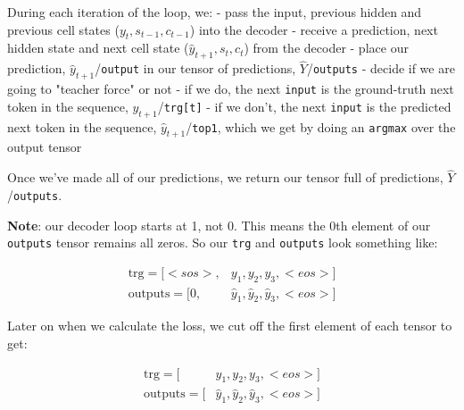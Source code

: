 \documentclass[11pt]{article}
\begin{document}
During each iteration of the loop, we: - pass the input, previous hidden
and previous cell states (\(y_t, s_{t-1}, c_{t-1}\)) into the decoder -
receive a prediction, next hidden state and next cell state
(\(\hat{y}_{t+1}, s_{t}, c_{t}\)) from the decoder - place our
prediction, \(\hat{y}_{t+1}\)/\texttt{output} in our tensor of
predictions, \(\hat{Y}\)/\texttt{outputs} - decide if we are going to
"teacher force" or not - if we do, the next \texttt{input} is the
ground-truth next token in the sequence, \(y_{t+1}\)/\texttt{trg{[}t{]}}
- if we don't, the next \texttt{input} is the predicted next token in
the sequence, \(\hat{y}_{t+1}\)/\texttt{top1}, which we get by doing an
\texttt{argmax} over the output tensor

Once we've made all of our predictions, we return our tensor full of
predictions, \(\hat{Y}\)/\texttt{outputs}.

\textbf{Note}: our decoder loop starts at 1, not 0. This means the 0th
element of our \texttt{outputs} tensor remains all zeros. So our
\texttt{trg} and \texttt{outputs} look something like:

\[\begin{align*}
\text{trg} = [<sos>, &y_1, y_2, y_3, <eos>]\\
\text{outputs} = [0, &\hat{y}_1, \hat{y}_2, \hat{y}_3, <eos>]
\end{align*}\]

Later on when we calculate the loss, we cut off the first element of
each tensor to get:

\[\begin{align*}
\text{trg} = [&y_1, y_2, y_3, <eos>]\\
\text{outputs} = [&\hat{y}_1, \hat{y}_2, \hat{y}_3, <eos>]
\end{align*}\]
\end{document}

